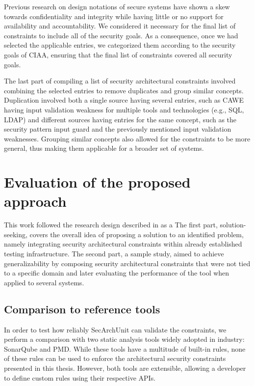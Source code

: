 Previous research on design notations of secure systems have shown a skew towards confidentiality and integrity while having little or no support for availability and accountability. We considered it necessary for the final list of constraints to include all of the security goals. As a consequence, once we had selected the applicable entries, we categorized them according to the security goals of CIAA, ensuring that the final list of constraints covered all security goals. 

The last part of compiling a list of security architectural constraints involved combining the selected entries to remove duplicates and group similar concepts. Duplication involved both a single source having several entries, such as CAWE having input validation weakness for multiple tools and technologies (e.g., SQL, LDAP) and different sources having entries for the same concept, such as the security pattern input guard and the previously mentioned input validation weaknesses. Grouping similar concepts also allowed for the constraints to be more general, thus making them applicable for a broader set of systems. 



\section{Evaluation of the proposed approach}\label{sec:evaluation}

This work followed the research design described in \cite{stol_abc_2018} as a   The first part, solution-seeking, covers the overall idea of proposing a solution to an identified problem, namely integrating security architectural constraints within already established testing infrastructure.  The second part, a sample study, aimed to achieve generalizability by composing security architectural constraints that were not tied to a specific domain and later evaluating the performance of the tool when applied to several systems.



\subsection{Comparison to reference tools}\label{sec_tools_used_in_comparison}
In order to test how reliably SecArchUnit can validate the constraints, we perform a comparison with two static analysis tools widely adopted in industry: SonarQube and PMD.
While these tools have a multitude of built-in rules, none of these rules can be used to enforce the architectural security constraints presented in this thesis. However, both tools are extensible, allowing a developer to define custom rules using their respective APIs.

